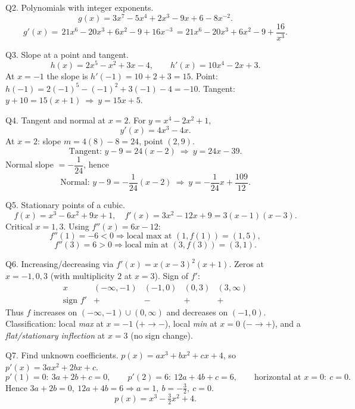 \documentclass[11pt]{article}
\def\textbf#1{#1}%
\begin{document}
\begin{solution}
\textbf{Q2. Polynomials with integer exponents.}
\[
g(x)=3x^{7}-5x^{4}+2x^{3}-9x+6-8x^{-2}.
\]
\[
g'(x)=\boxed{\,21x^{6}-20x^{3}+6x^{2}-9+16x^{-3}\,}
=21x^{6}-20x^{3}+6x^{2}-9+\dfrac{16}{x^{3}}.
\]
\end{solution}

\begin{solution}
\textbf{Q3. Slope at a point and tangent.}
\[
h(x)=2x^{5}-x^{2}+3x-4,\qquad h'(x)=\boxed{10x^{4}-2x+3}.
\]
At $x=-1$ the slope is $h'(-1)=10+2+3= \boxed{15}$.  
Point: $h(-1)=2(-1)^{5}-(-1)^{2}+3(-1)-4=-10$.  
Tangent: $y+10=15(x+1)\ \Rightarrow\ \boxed{y=15x+5}$.
\end{solution}

\begin{solution}
\textbf{Q4. Tangent and normal at $x=2$.}
For $y=x^{4}-2x^{2}+1$,
\[
y'(x)=4x^{3}-4x.
\]
At $x=2$: slope $m=4(8)-8=24$, point $(2,9)$.
\[
\text{Tangent: }y-9=24(x-2)\ \Rightarrow\ \boxed{y=24x-39}.
\]
Normal slope $=-\dfrac{1}{24}$, hence
\[
\text{Normal: }y-9=-\frac{1}{24}(x-2)\ \Rightarrow\ \boxed{y=-\frac{1}{24}x+\frac{109}{12}}.
\]
\end{solution}

\begin{solution}
\textbf{Q5. Stationary points of a cubic.}
\[
f(x)=x^{3}-6x^{2}+9x+1,\quad f'(x)=3x^{2}-12x+9=3(x-1)(x-3).
\]
Critical $x=\boxed{1,3}$. Using $f''(x)=6x-12$:
\[
f''(1)=-6<0 \Rightarrow \text{local max at }(1,f(1))=(1,5),
\]
\[
f''(3)=6>0 \Rightarrow \text{local min at }(3,f(3))=(3,1).
\]
\end{solution}

\begin{solution}
\textbf{Q6. Increasing/decreasing via $f'(x)=x(x-3)^{2}(x+1)$.}
Zeros at $x=-1,0,3$ (with multiplicity $2$ at $x=3$).  
Sign of $f'$:
\[
\begin{array}{c|cccc}
x & (-\infty,-1) & (-1,0) & (0,3) & (3,\infty)\\\hline
\text{sign }f' & + & - & + & +
\end{array}
\]
Thus $f$ increases on $(-\infty,-1)\cup(0,\infty)$ and decreases on $(-1,0)$.  
Classification: local \emph{max} at $x=-1$ ($+\to-$), local \emph{min} at $x=0$ ($-\to+$), and a \emph{flat/stationary inflection} at $x=3$ (no sign change).
\end{solution}

\begin{solution}
\textbf{Q7. Find unknown coefficients.}
$p(x)=ax^{3}+bx^{2}+cx+4$, so $p'(x)=3ax^{2}+2bx+c$.
\[
p'(1)=0:\ 3a+2b+c=0,\qquad
p'(2)=6:\ 12a+4b+c=6,\qquad
\text{horizontal at }x=0:\ c=0.
\]
Hence $3a+2b=0,\ 12a+4b=6\Rightarrow a=1,\ b=-\tfrac{3}{2},\ c=0$.  
\[
\boxed{p(x)=x^{3}-\tfrac{3}{2}x^{2}+4}.
\]
\end{solution}
\end{document}
